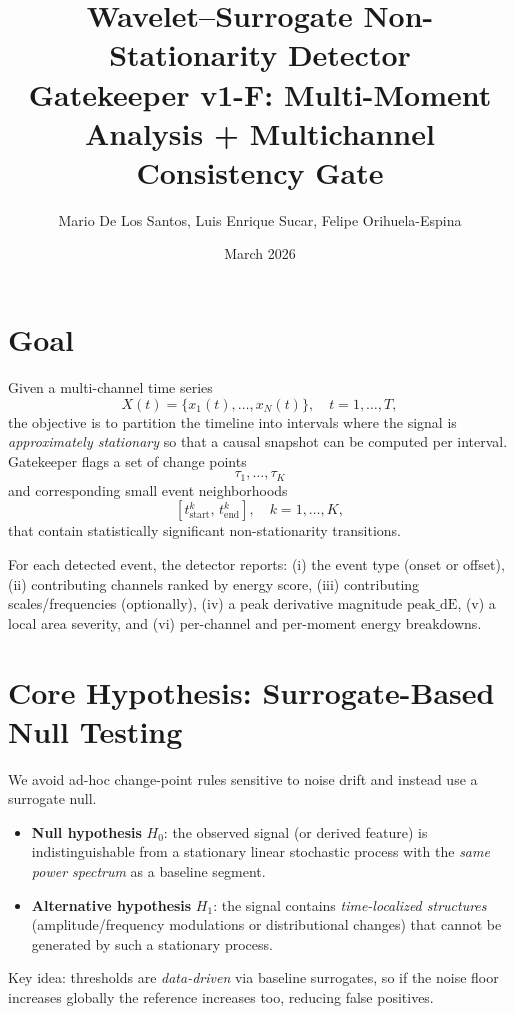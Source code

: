 \documentclass{article}
\title{Wavelet--Surrogate Non-Stationarity Detector\\
\large Gatekeeper v1-F: Multi-Moment Analysis + Multichannel Consistency Gate}
\author{Mario De Los Santos, Luis Enrique Sucar, Felipe Orihuela-Espina}
\date{March 2026}
\begin{document}
\maketitle
\tableofcontents
\newpage

\section{Goal}
Given a multi-channel time series
\[
X(t)=\{x_1(t),\dots,x_N(t)\}, \quad t=1,\dots,T,
\]
the objective is to partition the timeline into intervals where the signal is
\emph{approximately stationary} so that a causal snapshot can be computed per interval.
Gatekeeper flags a set of change points
\[
\tau_1,\dots,\tau_K
\]
and corresponding small event neighborhoods
\[
[t_{\text{start}}^k,\, t_{\text{end}}^k],\quad k=1,\dots,K,
\]
that contain statistically significant non-stationarity transitions.

For each detected event, the detector reports:
(i) the event type (onset or offset),
(ii) contributing channels ranked by energy score,
(iii) contributing scales/frequencies (optionally),
(iv) a peak derivative magnitude $\mathrm{peak\_dE}$,
(v) a local area severity, and
(vi) per-channel and per-moment energy breakdowns.

\section{Core Hypothesis: Surrogate-Based Null Testing}
We avoid ad-hoc change-point rules sensitive to noise drift and instead use a surrogate null.

\begin{itemize}
  \item \textbf{Null hypothesis} $H_0$: the observed signal (or derived feature) is indistinguishable from a stationary linear stochastic process with the \emph{same power spectrum} as a baseline segment.
  \item \textbf{Alternative hypothesis} $H_1$: the signal contains \emph{time-localized structures} (amplitude/frequency modulations or distributional changes) that cannot be generated by such a stationary process.
\end{itemize}

Key idea: thresholds are \emph{data-driven} via baseline surrogates, so if the noise floor increases globally the reference increases too, reducing false positives.
\end{document}
